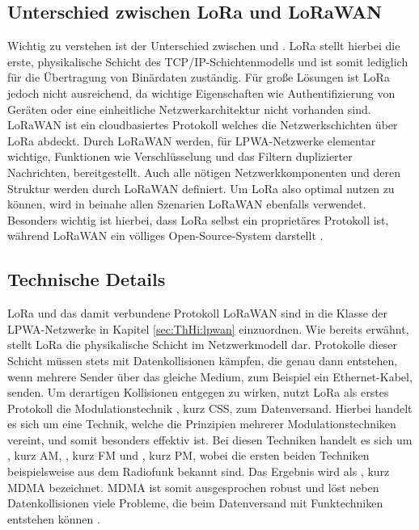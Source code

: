 \subsection{Unterschied zwischen LoRa und LoRaWAN}
\label{sec:ThHi:lorawan}

Wichtig zu verstehen ist der Unterschied zwischen  und . LoRa stellt hierbei die erste, physikalische Schicht des TCP/IP-Schichtenmodells und ist somit lediglich für die Übertragung von Binärdaten zuständig. Für große Lösungen ist LoRa jedoch nicht ausreichend, da wichtige Eigenschaften wie Authentifizierung von Geräten oder eine einheitliche Netzwerkarchitektur nicht vorhanden sind. LoRaWAN ist ein cloudbasiertes Protokoll welches die Netzwerk\-schichten über LoRa abdeckt. Durch LoRaWAN werden, für LPWA-Netzwerke elementar wichtige, Funktionen wie Verschlüsselung und das Filtern duplizierter Nachrichten, bereitgestellt. Auch alle nötigen Netzwerk\-komponenten und deren Struktur werden durch LoRaWAN definiert. Um LoRa also optimal nutzen zu können, wird in beinahe allen Sze\-narien LoRaWAN ebenfalls verwendet. Besonders wichtig ist hierbei, dass LoRa selbst ein proprietäres Protokoll ist, während LoRaWAN ein völliges Open-Source-System darstellt .

\subsection{Technische Details}
\label{sec:ThHi:technisch}

LoRa und das damit verbundene Protokoll LoRaWAN sind in die Klasse der LPWA-Netzwerke in Kapitel \ref{sec:ThHi:lpwan} einzuordnen. Wie bereits erwähnt, stellt LoRa die physikalische Schicht im Netzwerkmodell dar. Protokolle dieser Schicht müssen stets mit Datenkollisionen kämpfen, die genau dann entstehen, wenn mehrere Sender über das gleiche Medium, zum Beispiel ein Ethernet-Kabel, senden. Um derartigen Kollisionen entgegen zu wirken, nutzt LoRa als erstes Protokoll die Modulationstechnik , kurz CSS, zum Datenversand. Hierbei handelt es sich um eine Technik, welche die Prinzipien mehrerer Modulationstechniken vereint, und somit besonders effektiv ist. Bei diesen Techniken handelt es sich um , kurz AM, , kurz FM und , kurz PM, wobei die ersten beiden Techniken beispielsweise aus dem Radiofunk bekannt sind. Das Ergebnis wird als , kurz MDMA bezeichnet. MDMA ist somit ausgesprochen robust und löst neben Datenkollisionen viele Probleme, die beim Datenversand mit Funktechniken entstehen können . 

